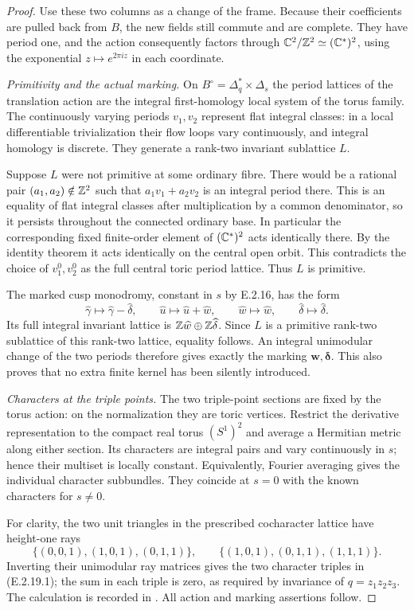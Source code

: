 \begin{proof}
Use these two columns as a
change of the frame.  Because
their coefficients are pulled
back from $B$, the new fields
still commute and are complete.
They have period one, and the
action consequently factors
through
$\mathbb C^2/\mathbb Z^2\simeq(\mathbb C^*)^2$,
using the exponential
$z\mapsto e^{2\pi i z}$
in each coordinate.

\emph{Primitivity and the actual marking.}
On $B^\circ=\Delta_q^*\times\Delta_s$
the period lattices of the
translation action are the
integral first-homology local
system of the torus family.
The continuously varying
periods $v_1,v_2$ represent
flat integral classes: in a
local differentiable
trivialization their flow
loops vary continuously, and
integral homology is discrete.
They generate a rank-two
invariant sublattice $L$.

Suppose $L$ were not primitive
at some ordinary fibre.  There
would be a rational pair
$(a_1,a_2)\notin\mathbb Z^2$ such
that $a_1v_1+a_2v_2$ is an
integral period there.  This
is an equality of flat
integral classes after
multiplication by a common
denominator, so it persists
throughout the connected
ordinary base.  In particular
the corresponding fixed
finite-order element of
$(\mathbb C^*)^2$ acts identically
there.  By the identity
theorem it acts identically
on the central open orbit.
This contradicts the choice
of $v_1^0,v_2^0$ as the full
central toric period lattice.
Thus $L$ is primitive.

The marked cusp monodromy,
constant in $s$ by E.2.16,
has the form
\[
 \widehat\gamma\longmapsto
       \widehat\gamma-\widehat\delta,
 \qquad
 \widehat u\longmapsto\widehat u+\widehat w,
 \qquad
 \widehat w\longmapsto\widehat w,
 \qquad
 \widehat\delta\longmapsto\widehat\delta.
 \tag{E.2.19.6}
\]
Its full integral invariant
lattice is
$\mathbb Z\widehat w\oplus\mathbb Z\widehat\delta$.
Since $L$ is a primitive
rank-two sublattice of this
rank-two lattice, equality
follows.  An integral
unimodular change of the two
periods therefore gives
exactly the marking
$\mathbf w,\boldsymbol\delta$.
This also proves that no
extra finite kernel has been
silently introduced.

\emph{Characters at the triple points.}
The two triple-point sections
are fixed by the torus action:
on the normalization they
are toric vertices.  Restrict
the derivative representation
to the compact real torus
$(S^1)^2$ and average a
Hermitian metric along either
section.  Its characters
are integral pairs and
vary continuously in $s$;
hence their multiset is
locally constant.  Equivalently,
Fourier averaging gives the
individual character
subbundles.  They coincide
at $s=0$ with the known
characters for $s\ne0$.

For clarity, the two unit
triangles in the prescribed
cocharacter lattice have
height-one rays
\[
 \{(0,0,1),(1,0,1),(0,1,1)\},
 \qquad
 \{(1,0,1),(0,1,1),(1,1,1)\}.
\]
Inverting their unimodular
ray matrices gives the two
character triples in
(E.2.19.1); the sum in
each triple is zero, as
required by invariance of
$q=z_1z_2z_3$.
The calculation is recorded
in .
All action and marking
assertions follow.
\end{proof}
